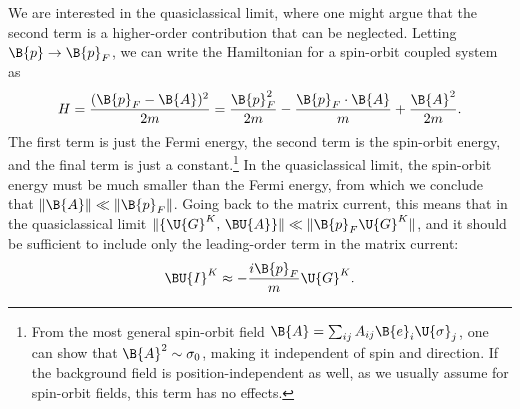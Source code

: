 We are interested in the quasiclassical limit, where one might argue that the second term is a higher-order contribution that can be neglected.
Letting $\B{p} \rightarrow \B{p}_F$, we can write the Hamiltonian for a spin-orbit coupled system as
\begin{equation}
  H = \frac{(\B{p}_F - \B{A})^2}{2m} = \frac{\B{p}_F^2}{2m} - \frac{\B{p}_F\cdot\B{A}}{m} + \frac{\B{A}^2}{2m} .
\end{equation}
The first term is just the Fermi energy, the second term is the spin-orbit energy, and the final term is just a constant.\footnote{From the most general spin-orbit field $\B{A} = \sum_{ij} A_{ij} \B{e}_i \U{\sigma}_j$, one can show that ${\B{A}^2 \sim \sigma_0}$, making it independent of spin and direction. If the background field is position-independent as well, as we usually assume for spin-orbit fields, this term has no effects.}
In the quasiclassical limit, the spin-orbit energy must be much smaller than the Fermi energy, from which we conclude that $\|\B{A}\| \ll \|\B{p}_F\|$.
Going back to the matrix current, this means that in the quasiclassical limit $\|\{\U{G}^K,\, \BU{A}\}\| \ll \|\B{p}_F\U{G}^K\|$, and it should be sufficient to include only the leading-order term in the matrix current:
\begin{equation}
  \BU{I}^K \approx -\frac{i\B{p}_F}{m} \U{G}^K .
\end{equation}




